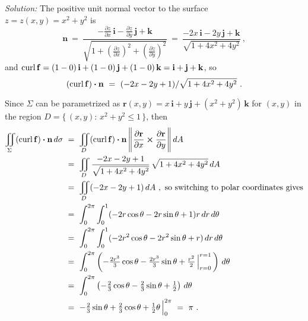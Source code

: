 \begin{exmp}
{
 }
 \par\noindent\emph{Solution:} The positive unit normal vector to the surface\\$z=z(x,y)=x^2 + y^2$ is
 \begin{displaymath}
  \mathbf{n} ~=~
   \frac{-\frac{\partial z}{\partial x}\,\mathbf{i} - \frac{\partial z}{\partial y}\,\mathbf{j} +
   \mathbf{k}}{\sqrt{1 + \left( \tfrac{\partial z}{\partial x} \right)^2 +
   \left( \tfrac{\partial z}{\partial y} \right)^2}} ~=~
   \frac{-2x\,\mathbf{i} - 2y\,\mathbf{j} + \mathbf{k}}{\sqrt{1 + 4x^2 + 4y^2}} ~,
 \end{displaymath}
 and $\mathop{\mathrm{curl}}\nolimits\mathbf{f}= (1-0)\,\mathbf{i}+(1-0)\,\mathbf{j}+(1-0)\,\mathbf{k} = \mathbf{i}+\mathbf{j}+\mathbf{k}$,
 so
 \begin{displaymath}
  (\mathop{\mathrm{curl}}\nolimits\mathbf{f}) \bm{\cdot} \mathbf{n} ~=~ (-2x-2y+1)/\sqrt{1 + 4x^2 + 4y^2} ~.
 \end{displaymath}
 
 \par\noindent
 Since $\Sigma$ can be parametrized as $\mathbf{r}(x,y) = x\,\mathbf{i}+y\,\mathbf{j}+(x^2 + y^2 )\,\mathbf{k}$ for
 $(x,y)$ in the region $D = \lbrace \, (x,y):\,x^2 + y^2 \le 1 \,\rbrace$, then
 \begin{align*}
  \iint\limits_{\Sigma} (\mathop{\mathrm{curl}}\nolimits\mathbf{f}) \bm{\cdot} \mathbf{n}\,d\sigma ~&=~
   \iint\limits_{D} (\mathop{\mathrm{curl}}\nolimits\mathbf{f}) \bm{\cdot} \mathbf{n}\,
   \Biggl\lVert\mspace{1mu}\frac{\partial \mathbf{r}}{\partial x} \bm{\times} \frac{\partial \mathbf{r}}{\partial y}\mspace{1mu}\Biggr\rVert\,dA\\
   &=~ \iint\limits_{D} \frac{-2x-2y+1}{\sqrt{1 + 4x^2 + 4y^2}}\,\sqrt{1 + 4x^2 + 4y^2}\,dA\\
   &=~ \iint\limits_{D} (-2x-2y+1)\,dA ~,~\text{so switching to polar coordinates gives}\\
   &=~ \int_0^{2\pi} \int_0^1 (-2r\cos \theta - 2r\sin \theta + 1)r\,dr\,d\theta\\
   &=~ \int_0^{2\pi} \int_0^1 (-2r^2 \cos \theta - 2r^2 \sin \theta + r)\,dr\,d\theta\\
   &=~ \int_0^{2\pi} \left( -\tfrac{2r^3}{3} \cos \theta - \tfrac{2r^3}{3} \sin \theta +
   \tfrac{r^2}{2}\,\Big|_{r=0}^{r=1} \,\right)\,d\theta\\
   &=~ \int_0^{2\pi} \left( -\tfrac{2}{3} \cos \theta - \tfrac{2}{3} \sin \theta + \tfrac{1}{2} \right)\,d\theta\\
   &=~ -\tfrac{2}{3} \sin \theta + \tfrac{2}{3} \cos \theta + \tfrac{1}{2}\theta\,\Big|_0^{2\pi} ~=~ \pi ~.
 \end{align*}
 

\end{exmp}
